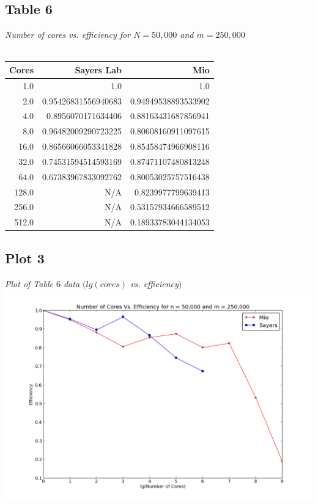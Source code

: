\documentclass[letterpaper, 12pt]{article}
\begin{document}
	\subsection*{Table 6} \small\textit{Number of cores vs. efficiency for $N=50,000$ and $m=250,000$} \\\\
	\normalsize
	\begin{tabular}{r||r|r}
	\hline
		Cores              &Sayers Lab                     &Mio \\ 
	\hline
		  1.0                     &1.0                     &1.0 \\ 
		  2.0     &0.95426831556940683     &0.94949538893533902 \\ 
		  4.0      &0.8956070171634406     &0.88163431687856941 \\ 
		  8.0     &0.96482009290723225     &0.80608160911097615 \\ 
		 16.0     &0.86566066053341828     &0.85458474966908116 \\ 
		 32.0     &0.74531594514593169     &0.87471107480813248 \\ 
		 64.0     &0.67383967833092762     &0.80053025757516438 \\ 
		128.0                     &N/A      &0.8239977799639413 \\ 
		256.0                     &N/A     &0.53157934666589512 \\ 
		512.0                     &N/A     &0.18933783044134053 \\ 
		\hline
	\end{tabular}
	
	\subsection*{Plot 3} \small\textit{Plot of Table $6$ data $(lg(cores)$ vs. efficiency$)$} \\
	\normalsize
	\includegraphics[width=.75\linewidth]{ProjectFiles/results/plots/coresVefficiency.png}
	
\end{document}

